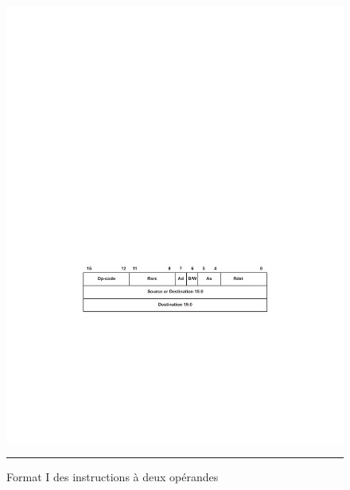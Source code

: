 \begin{figure}[htb]
  \centering
  \includegraphics[angle=0, width=14cm]{./Figures/Assembleur/Inst_format_1.pdf}
  \rule{35em}{0.5pt}
  \caption[Schéma Timer]{Format I des instructions à deux opérandes}
  \label{fig:Inst_format_1}
\end{figure}

